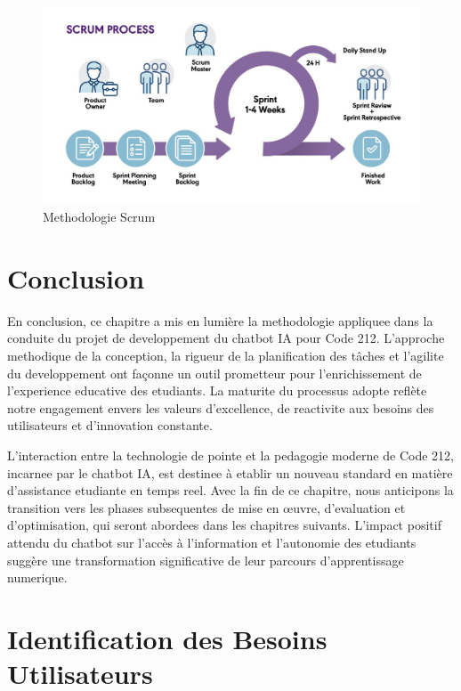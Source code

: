\begin{figure}[H]
\centering
\includegraphics[width=\textwidth]{assets/images/scrum.jpg}
\caption{Methodologie Scrum}
\label{fig:methodologie_scrum}
\end{figure}

\section{Conclusion}
En conclusion, ce chapitre a mis en lumière la methodologie appliquee dans la conduite du projet de developpement du chatbot IA pour Code 212. L'approche methodique de la conception, la rigueur de la planification des tâches et l'agilite du developpement ont façonne un outil prometteur pour l'enrichissement de l'experience educative des etudiants. La maturite du processus adopte reflète notre engagement envers les valeurs d'excellence, de reactivite aux besoins des utilisateurs et d'innovation constante.

L'interaction entre la technologie de pointe et la pedagogie moderne de Code 212, incarnee par le chatbot IA, est destinee à etablir un nouveau standard en matière d'assistance etudiante en temps reel. Avec la fin de ce chapitre, nous anticipons la transition vers les phases subsequentes de mise en œuvre, d'evaluation et d'optimisation, qui seront abordees dans les chapitres suivants. L'impact positif attendu du chatbot sur l'accès à l'information et l'autonomie des etudiants suggère une transformation significative de leur parcours d'apprentissage numerique.

\section{Identification des Besoins Utilisateurs}
